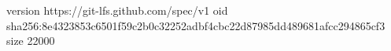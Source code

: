 version https://git-lfs.github.com/spec/v1
oid sha256:8e4323853c6501f59c2b0c32252adbf4cbc22d87985dd489681afcc294865cf3
size 22000
